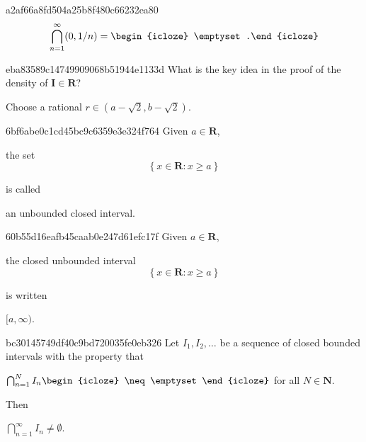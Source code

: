 \begin{note}{a2af66a8fd504a25b8f480c66232ea80}
    \[
        \bigcap_{n = 1}^{\infty} (0, 1/n) = \begin{icloze}{1}\emptyset.\end{icloze}
    \]
\end{note}

\begin{note}{eba83589c14749909068b51944e1133d}
    What is the key idea in the proof of the density of \({ \mathbf{I} \in \mathbf{R} }\)?

    \begin{cloze}{1}
        Choose a rational \({ r \in (a - \sqrt{2}, b - \sqrt{2}) }\).
    \end{cloze}
\end{note}

\begin{note}{6bf6abe0c1cd45bc9c6359e3e324f764}
    Given \({ a \in \mathbf{R} }\),
    \begin{icloze}{2}
        the set
        \[
            \left\{ x \in \mathbf{R} : x \geq a \right\}
        \]
    \end{icloze}
    is called \begin{icloze}{1}an unbounded closed interval.\end{icloze}
\end{note}

\begin{note}{60b55d16eafb45caab0e247d61efc17f}
    Given \({ a \in \mathbf{R} }\),
    \begin{icloze}{2}
        the closed unbounded interval
        \[
            \left\{ x \in \mathbf{R} : x \geq a \right\}
        \]
    \end{icloze}
    is written \begin{icloze}{1}\({ [a, \infty) }\).\end{icloze}
\end{note}

\begin{note}{bc30145749df40c9bd720035fe0eb326}
    Let \({ I_1, I_2, \ldots }\) be a sequence of closed bounded intervals with the property that
    \begin{center}
        \({ \bigcap_{n = 1}^{N} I_n \begin{icloze}{2}\neq \emptyset\end{icloze} }\) for all \({ N \in \mathbf{N} }\).
    \end{center}
    Then \begin{icloze}{1}\({ \bigcap_{n = 1}^{\infty} I_n \neq \emptyset }\).\end{icloze}
\end{note}

